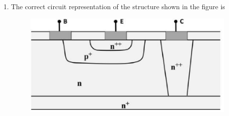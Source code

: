 \documentclass[a4paper, 11pt]{article}
\begin{document}
\begin{enumerate}
    \item The correct circuit representation of the structure shown in the figure is
    \begin{figure}[H]
        \centering
        \includegraphics[width=0.5\columnwidth]{figs/q9.png}
        \caption*{}
        \label{fig:q9}
    \end{figure}
    \begin{enumerate}
\end{enumerate}
\end{enumerate}
\end{document}
